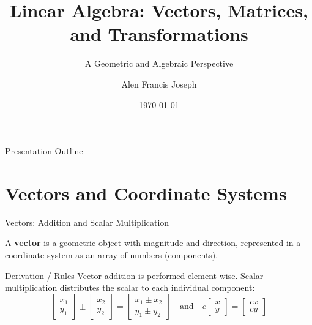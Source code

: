 \documentclass[10pt, aspectratio=169]{beamer}
\title[Linear Algebra Fundamentals]{Linear Algebra: Vectors, Matrices, and Transformations}
\subtitle{A Geometric and Algebraic Perspective}
\author{Alen Francis Joseph}
\institute{M.Tech CSE (DS and AI), DCS, CUSAT}
\date{\today}
\begin{document}
\begin{frame}
    \titlepage
\end{frame}

\begin{frame}{Presentation Outline}
    \tableofcontents
\end{frame}

\section{Vectors and Coordinate Systems}

\begin{frame}{Vectors: Addition and Scalar Multiplication}
    \begin{definition}
        A \textbf{vector} is a geometric object with magnitude and direction, represented in a coordinate system as an array of numbers (components).
    \end{definition}

    \begin{block}{Derivation / Rules}
        Vector addition is performed element-wise. Scalar multiplication distributes the scalar to each individual component:
        $$\begin{bmatrix} x_1 \\ y_1 \end{bmatrix} \pm \begin{bmatrix} x_2 \\ y_2 \end{bmatrix} = \begin{bmatrix} x_1 \pm x_2 \\ y_1 \pm y_2 \end{bmatrix} \quad \text{and} \quad c \begin{bmatrix} x \\ y \end{bmatrix} = \begin{bmatrix} cx \\ cy \end{bmatrix}$$
    \end{block}
\end{frame}
\end{document}
